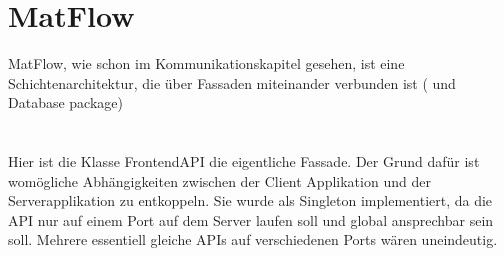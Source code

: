 \section{MatFlow}
MatFlow, wie schon im Kommunikationskapitel gesehen, ist eine Schichtenarchitektur, die über Fassaden miteinander verbunden ist
( und Database package)

\section{}
Hier ist die Klasse FrontendAPI die eigentliche Fassade. Der Grund dafür ist womögliche Abhängigkeiten zwischen
der Client Applikation und der Serverapplikation zu entkoppeln. Sie wurde als Singleton implementiert, da die API
nur auf einem Port auf dem Server laufen soll und global ansprechbar sein soll. Mehrere essentiell gleiche APIs auf
verschiedenen Ports wären uneindeutig.


\newpage